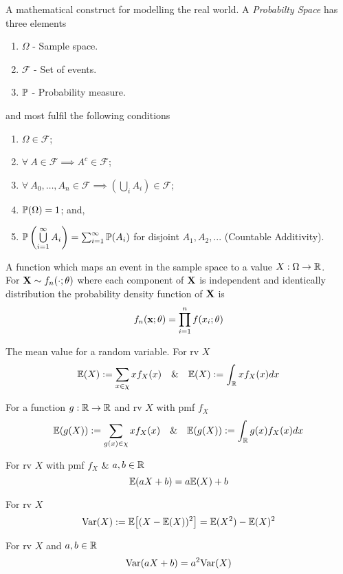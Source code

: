 \documentclass[11pt,a4paper]{article}
\begin{document}
A mathematical construct for modelling the real world. A \textit{Probabilty Space} has three elements
\begin{enumerate}[label=\roman*)]
	\item $\Omega$ - Sample space.
	\item $\mathcal{F}$ - Set of events.
	\item $\mathbb{P}$ - Probability measure.
\end{enumerate}
and most fulfil the following conditions
\begin{enumerate}[label=\roman*)]
	\item $\Omega\in\mathcal{F}$;
	\item $\forall\ A\in\mathcal{F}\implies A^c\in\mathcal{F}$;
	\item $\forall\ A_0,\dots,A_n\in\mathcal{F}\implies\left(\bigcup\limits_iA_i\right)\in\mathcal{F}$;
	\item $\mathbb{P}(\Omega)=1$; and,
	\item $\mathbb{P}\left(\bigcup\limits_{i=1}^\infty A_i\right)=\sum_{i=1}^\infty\mathbb{P}(A_i)$ for disjoint $A_1,A_2,...$ (Countable Additivity).
\end{enumerate}

A function which maps an event in the sample space to a value \eg $X:\Omega\to\mathbb{R}$.\\

For $\textbf{X}\sim f_n(\cdot;\theta)$ where each component of $\textbf{X}$ is independent and identically distribution the probability density function of $\textbf{X}$ is
$$f_n(\textbf{x};\theta)=\prod\limits_{i=1}^nf(x_i;\theta)$$

The mean value for a random variable. For rv $X$
$$\mathbb{E}(X):=\sum_{x\in\chi}xf_X(x)\quad\&\quad\mathbb{E}(X):=\int_{\mathbb{R}} xf_X(x)dx$$

For a function $g:\mathbb{R}\to\mathbb{R}$ and rv $X$ with pmf $f_X$
$$\mathbb{E}(g(X)):=\sum_{g(x)\in\chi}xf_X(x)\quad\&\quad\mathbb{E}(g(X)):=\int_{\mathbb{R}} g(x)f_X(x)dx$$

For rv $X$ with pmf $f_X$ \& $a,b\in\mathbb{R}$
$$\mathbb{E}(aX+b)=a\mathbb{E}(X)+b$$

For rv $X$
$$\mathrm{Var}(X):=\mathbb{E}\big[(X-\mathbb{E}(X))^2\big]=\mathbb{E}(X^2)-\mathbb{E}(X)^2$$

For rv $X$ and $a,b\in\mathbb{R}$
$$\mathrm{Var}(aX+b)=a^2\mathrm{Var}(X)$$
\end{document}
